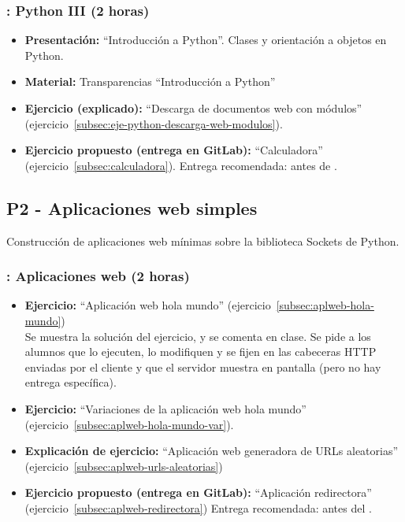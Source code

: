 \documentclass[a4paper,12pt]{article}
\begin{document}
\subsubsection{\juevesD: Python III (2 horas)}
\label{cal:juevesD}

\begin{itemize}
\item \textbf{Presentación:} ``Introducción a Python''. Clases y orientación a objetos en Python.
\item \textbf{Material:} Transparencias ``Introducción a Python''
\item \textbf{Ejercicio (explicado):} ``Descarga de documentos web con módulos'' (ejercicio~\ref{subsec:eje-python-descarga-web-modulos}).  
\item \textbf{Ejercicio propuesto (entrega en GitLab):} ``Calculadora'' (ejercicio~\ref{subsec:calculadora}). Entrega recomendada: antes de \juevesE.

\end{itemize}




\subsection{P2 - Aplicaciones web simples}


Construcción de aplicaciones web mínimas sobre la biblioteca Sockets de Python.


\subsubsection{\juevesE: Aplicaciones web (2 horas)}
\label{cal:juevesE}

\begin{itemize}
 \item \textbf{Ejercicio:} ``Aplicación web hola mundo'' (ejercicio~\ref{subsec:aplweb-hola-mundo}) \\
   Se muestra la solución del ejercicio, y se comenta en clase. Se pide a los alumnos que lo ejecuten, lo modifiquen y se fijen en las cabeceras HTTP enviadas por el cliente y que el servidor muestra en pantalla (pero no hay entrega específica).
 \item \textbf{Ejercicio:} ``Variaciones de la aplicación web hola mundo'' (ejercicio~\ref{subsec:aplweb-hola-mundo-var}).
\item \textbf{Explicación de ejercicio:} ``Aplicación web generadora de URLs aleatorias'' (ejercicio~\ref{subsec:aplweb-urls-aleatorias})
\item \textbf{Ejercicio propuesto (entrega en GitLab):} ``Aplicación redirectora'' (ejercicio~\ref{subsec:aplweb-redirectora})
   Entrega recomendada: antes del \juevesF.
\end{itemize}
\end{document}
